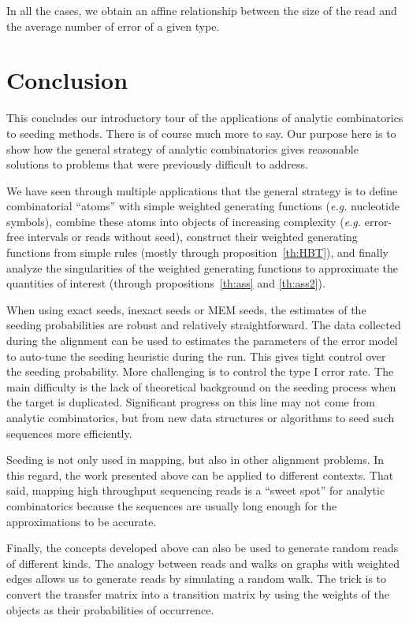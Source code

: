 \documentclass{article}
\begin{document}
In all the cases, we obtain an affine relationship between the size of the
read and the average number of error of a given type.


\section{Conclusion}

This concludes our introductory tour of the applications of analytic
combinatorics to seeding methods. There is of course much more to say. Our
purpose here is to show how the general strategy of analytic combinatorics
gives reasonable solutions to problems that were previously difficult to
address.

We have seen through multiple applications that the general strategy is to
define combinatorial ``atoms'' with simple weighted generating functions
(\textit{e.g.} nucleotide symbols), combine these atoms into objects of
increasing complexity (\textit{e.g.} error-free intervals or reads
without seed), construct their weighted generating functions from simple
rules (mostly through proposition~\ref{th:HBT}), and finally analyze the
singularities of the weighted generating functions to approximate the
quantities of interest (through propositions~\ref{th:ass} and
\ref{th:ass2}).

When using exact seeds, inexact seeds or MEM seeds, the estimates of the
seeding probabilities are robust and relatively straightforward. The data
collected during the alignment can be used to estimates the parameters of
the error model to auto-tune the seeding heuristic during the run. This
gives tight control over the seeding probability. More challenging is to
control the type I error rate. The main difficulty is the lack of
theoretical background on the seeding process when the target is
duplicated. Significant progress on this line may not come from analytic
combinatorics, but from new data structures or algorithms to seed such
sequences more efficiently.

Seeding is not only used in mapping, but also in other alignment problems.
In this regard, the work presented above can be applied to different
contexts. That said, mapping high throughput sequencing reads is a ``sweet
spot'' for analytic combinatorics because the sequences are usually long
enough for the approximations to be accurate.

Finally, the concepts developed above can also be used to generate random
reads of different kinds. The analogy between reads and walks on graphs
with weighted edges allows us to generate reads by simulating a random
walk. The trick is to convert the transfer matrix into a transition matrix
by using the weights of the objects as their probabilities of occurrence.
\end{document}
